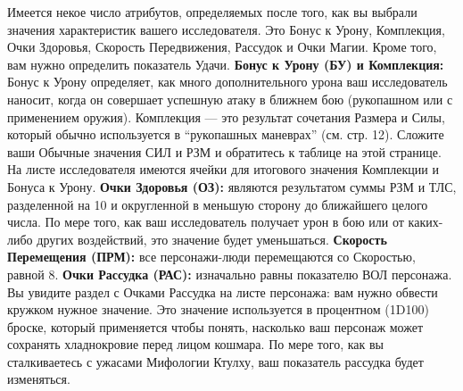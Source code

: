 \documentclass[letterpaper,twocolumn,openany, twoside, 11pt, usenames]{cocbook}
\newlength{\seplinewidth}
\newlength{\seplinesep}
\newcommand*{\sepline}{%
  \par
  \vspace{\dimexpr\seplinesep+.5\parskip}%
  \cleaders\vbox{%
    \begingroup %
      \color{sepline}%
      \hrule width\linewidth height\seplinewidth
    \endgroup
  }\vskip\seplinewidth
  \vspace{\dimexpr\seplinesep-.5\parskip}%
}
\begin{document}
Имеется некое число атрибутов, определяемых после того, как вы выбрали значения характеристик вашего исследователя. Это Бонус к Урону, Комплекция, Очки Здоровья, Скорость Передвижения, Рассудок и Очки Магии. Кроме того, вам нужно определить показатель Удачи.
\smallbreak
\noindent \textbf{Бонус к Урону (БУ) и Комплекция:} Бонус к Урону определяет, как много дополнительного урона ваш исследователь наносит, когда он совершает успешную атаку в ближнем бою (рукопашном или с применением оружия). Комплекция --- это результат сочетания Размера и Силы, который обычно используется в ``рукопашных маневрах'' (см. стр. 12). Сложите ваши Обычные значения СИЛ и РЗМ и обратитесь к таблице на этой странице. На листе исследователя имеются ячейки для итогового значения Комплекции и Бонуса к Урону.
\smallbreak
\noindent \textbf{Очки Здоровья (ОЗ):} являются результатом суммы РЗМ и ТЛС, разделенной на 10 и округленной в меньшую сторону до ближайшего целого числа. По мере того, как ваш исследователь получает урон в бою или от каких-либо других воздействий, это значение будет уменьшаться.
\smallbreak
\noindent {}
\smallbreak
\noindent \textbf{Скорость Перемещения (ПРМ):} все персонажи-люди перемещаются со Скоростью, равной 8.
\smallbreak
\noindent \textbf{Очки Рассудка (РАС):} изначально равны показателю ВОЛ персонажа. Вы увидите раздел с Очками Рассудка на листе персонажа: вам нужно обвести кружком нужное значение. Это значение используется в процентном (1D100) броске, который применяется чтобы понять, насколько ваш персонаж может сохранять хладнокровие перед лицом кошмара. По мере того, как вы сталкиваетесь с ужасами Мифологии Ктулху, ваш показатель рассудка будет изменяться.
\smallbreak
\noindent {}
\smallbreak
{}
\end{document}
